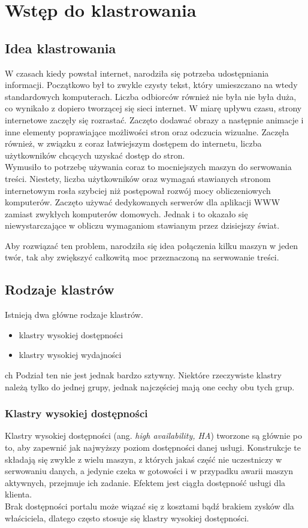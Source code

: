 \chapter{Wstęp do klastrowania}
\section{Idea klastrowania}
W czasach kiedy powstał internet, narodziła się potrzeba udostępniania informacji. Początkowo był to zwykle czysty tekst, który umieszczano na wtedy standardowych komputerach. Liczba odbiorców również nie była nie była duża, co wynikało z dopiero tworzącej się sieci internet.
W miarę upływu czasu, strony internetowe zaczęły się rozrastać. Zaczęto dodawać obrazy a następnie animacje i inne elementy poprawiające możliwości stron oraz odczucia wizualne. Zaczęła również, w związku z coraz łatwiejszym dostępem do internetu, liczba użytkowników chcących uzyskać dostęp do stron.\\
Wymusiło to potrzebę używania coraz to mocniejszych maszyn do serwowania treści. Niestety, liczba użytkowników oraz wymagań stawianych stronom internetowym rosła szybciej niż postępował rozwój mocy obliczeniowych komputerów. Zaczęto używać dedykowanych serwerów dla aplikacji WWW zamiast zwykłych komputerów domowych. Jednak i to okazało się niewystarczające w obliczu wymaganiom stawianym przez dzisiejszy świat.

Aby rozwiązać ten problem, narodziła się idea połączenia kilku maszyn w jeden twór, tak aby zwiększyć całkowitą moc przeznaczoną na serwowanie treści.
\section{Rodzaje klastrów}
Istnieją dwa główne rodzaje klastrów.
\begin{itemize}
\item klastry wysokiej dostępności
\item klastry wysokiej wydajności
\end{itemize}ch 
Podział ten nie jest jednak bardzo sztywny.
Niektóre rzeczywiste klastry należą tylko do jednej grupy, jednak najczęściej mają one cechy obu tych grup.
\subsection{Klastry wysokiej dostępności}
Klastry wysokiej dostępności (ang. \textit{high availability, HA}) tworzone są głównie po to, aby zapewnić jak najwyższy poziom dostępności danej usługi.
Konstrukcje te składają się zwykle z wielu maszyn, z których jakaś część nie uczestniczy w serwowaniu danych, a jedynie czeka w gotowości i w przypadku awarii maszyn aktywnych, przejmuje ich zadanie. Efektem jest ciągła dostępność usługi dla klienta.\\
Brak dostępności portalu może wiązać się z kosztami bądź brakiem zysków dla właściciela, dlatego często stosuje się klastry wysokiej dostępności.
